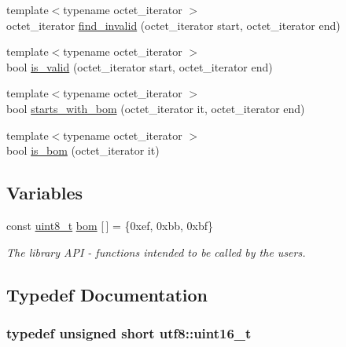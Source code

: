 \begin{DoxyCompactItemize}
\item 
{\footnotesize template$<$typename octet\+\_\+iterator $>$ }\\octet\+\_\+iterator \hyperlink{namespaceutf8_ae29721faca762865e83ffea06605acc5}{find\+\_\+invalid} (octet\+\_\+iterator start, octet\+\_\+iterator end)
\item 
{\footnotesize template$<$typename octet\+\_\+iterator $>$ }\\bool \hyperlink{namespaceutf8_add2dbec3d058aa66500ec4f97cc8174b}{is\+\_\+valid} (octet\+\_\+iterator start, octet\+\_\+iterator end)
\item 
{\footnotesize template$<$typename octet\+\_\+iterator $>$ }\\bool \hyperlink{namespaceutf8_a498c8e7d7a6fd92d4672ef05661dc783}{starts\+\_\+with\+\_\+bom} (octet\+\_\+iterator it, octet\+\_\+iterator end)
\item 
{\footnotesize template$<$typename octet\+\_\+iterator $>$ }\\bool \hyperlink{namespaceutf8_aed9555bcddc0fd46296bf4e5642229ed}{is\+\_\+bom} (octet\+\_\+iterator it)
\end{DoxyCompactItemize}
\subsection*{Variables}
\begin{DoxyCompactItemize}
\item 
const \hyperlink{namespaceutf8_abe793b552fabe390d134b97ab81d2c7f}{uint8\+\_\+t} \hyperlink{namespaceutf8_ac7efcab62f51d362fc741657e60b9b1d}{bom} \mbox{[}$\,$\mbox{]} = \{0xef, 0xbb, 0xbf\}
\begin{DoxyCompactList}\small\item\em The library A\+P\+I -\/ functions intended to be called by the users. \end{DoxyCompactList}\end{DoxyCompactItemize}


\subsection{Typedef Documentation}
\hypertarget{namespaceutf8_ac23066b92c5a1d9d9ef177201f750936}{}
\subsubsection[{uint16\+\_\+t}]{\setlength{\rightskip}{0pt plus 5cm}typedef unsigned short {\bf utf8\+::uint16\+\_\+t}}\label{namespaceutf8_ac23066b92c5a1d9d9ef177201f750936}
\hypertarget{namespaceutf8_a846259d2f173d524282583fc9d825b00}{}
